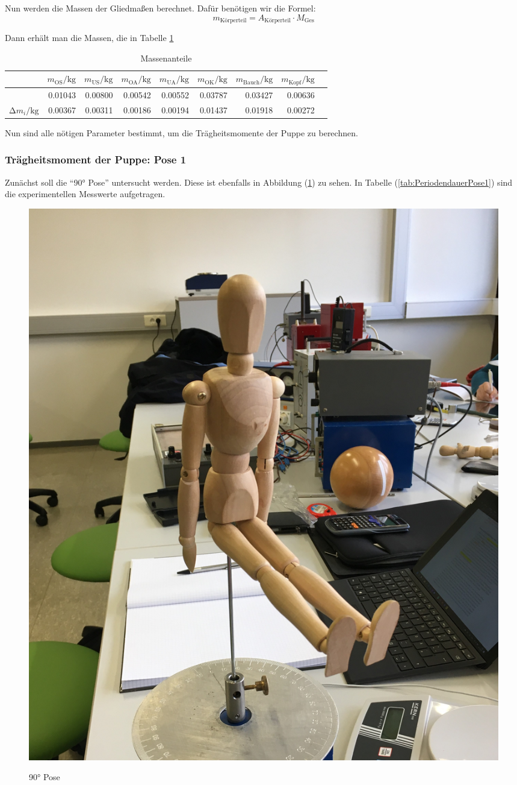 Nun werden die Massen der Gliedmaßen berechnet. Dafür benötigen wir die Formel:
\begin{equation*}
  m_{\text{Körperteil}} = A_{\text{Körperteil}} \cdot M_{\text{Ges}}
\end{equation*}

Dann erhält man die Massen, die in Tabelle {\ref{tab:Massenanteile}}

\begin{table}
  \centering
  \caption{Massenanteile}
  \label{tab:Massenanteile}
  \begin{tabular}{rrrrrrrrr}
    \toprule
    & $m_{\text{OS}} / \unit{\kilo\gram}$ &     $m_{\text{US}} / \unit{\kilo\gram}$ &     $m_{\text{OA}} / \unit{\kilo\gram}$ &     $m_{\text{UA}} / \unit{\kilo\gram}$    &    $m_{\text{OK}} / \unit{\kilo\gram}$ &     $m_{\text{Bauch}} / \unit{\kilo\gram}$ & $m_{\text{Kopf}} / \unit{\kilo\gram}$ \\
    \midrule
    & 0.01043 & 0.00800 & 0.00542 & 0.00552 & 0.03787 & 0.03427 & 0.00636 \\
    $\increment m_i / \unit{\kilo\gram}$ & 0.00367 & 0.00311 & 0.00186 & 0.00194 & 0.01437 & 0.01918 & 0.00272 \\ 
    \bottomrule
  \end{tabular}
\end{table}


Nun sind alle nötigen Parameter bestimmt, um die Trägheitsmomente der Puppe zu berechnen.

\subsubsection{Trägheitsmoment der Puppe: Pose 1}
Zunächst soll die \enquote{90° Pose} untersucht werden.
Diese ist ebenfalls in Abbildung (\ref{fig:pose1}) zu sehen.
In Tabelle (\ref{tab:PeriodendauerPose1}) sind die experimentellen Messwerte aufgetragen.


\begin{figure}[H]
  \caption{90° Pose}
  \centering
  \includegraphics[width=0.3\columnwidth]{pictures/puppe_rechter_winkel.jpg}
  \label{fig:pose1}
\end{figure}


